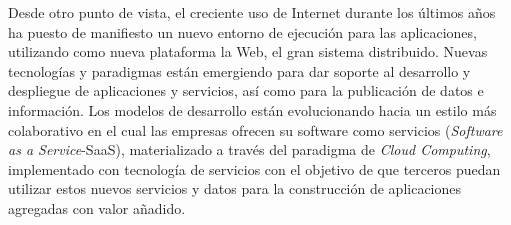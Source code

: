 Desde otro punto de vista, el creciente uso de Internet durante los últimos años ha puesto de manifiesto un
nuevo entorno de ejecución para las aplicaciones, utilizando como nueva
plataforma la Web, el gran sistema distribuido. Nuevas tecnologías y paradigmas
están emergiendo para dar soporte al desarrollo y despliegue de aplicaciones y
servicios, así como para la publicación de datos e información. Los modelos de
desarrollo están evolucionando hacia un estilo más colaborativo en el cual las empresas
ofrecen su software como servicios (\textit{Software as a Service}-\gls{SaaS}), materializado a
través del paradigma de \textit{Cloud Computing}, implementado con tecnología de
servicios con el objetivo de que terceros puedan utilizar estos nuevos servicios y datos para
la construcción de aplicaciones agregadas con valor añadido. 

